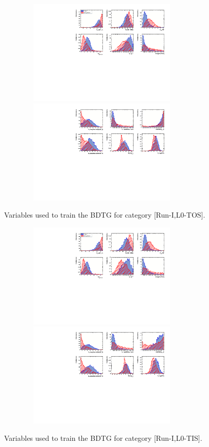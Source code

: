 \setcounter{figure}{0}
\setcounter{table}{0}

\renewcommand{\thefigure}{B.\arabic{figure}}
\renewcommand{\thetable}{B.\arabic{table}}

\begin{figure}[h]
\centering
\includegraphics[height=5cm,width=0.9\textwidth]{figs/TMVA/BDTG_Data_run1_t0_all/variables_id_c1.pdf}
\includegraphics[height=5cm,width=0.9\textwidth]{figs/TMVA/BDTG_Data_run1_t0_all/variables_id_c2.pdf}
\caption{Variables used to train the BDTG for category [Run-I,\textsf{L0-TOS}].}
\label{fig:}
\includegraphics[height=5cm,width=0.9\textwidth]{figs/TMVA/BDTG_Data_run1_t1_all/variables_id_c1.pdf}
\includegraphics[height=5cm,width=0.9\textwidth]{figs/TMVA/BDTG_Data_run1_t1_all/variables_id_c2.pdf}
\caption{Variables used to train the BDTG for category [Run-I,\textsf{L0-TIS}].}
\label{fig:}
\end{figure}

